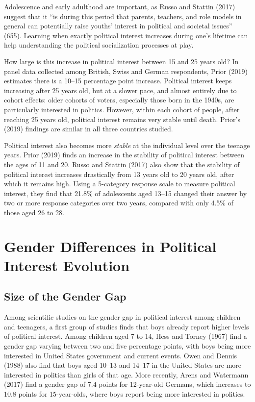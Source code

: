 \documentclass[
  letterpaper,
  DIV=11,
  numbers=noendperiod]{scrreprt}
\begin{document}
Adolescence and early adulthood are important, as Russo and Stattin
(2017) suggest that it ``is during this period that parents, teachers,
and role models in general can potentially raise youths' interest in
political and societal issues'' (655). Learning when exactly political
interest increases during one's lifetime can help understanding the
political socialization processes at play.

How large is this increase in political interest between 15 and 25 years
old? In panel data collected among British, Swiss and German
respondents, Prior (2019) estimates there is a 10--15 percentage point
increase. Political interest keeps increasing after 25 years old, but at
a slower pace, and almost entirely due to cohort effects: older cohorts
of voters, especially those born in the 1940s, are particularly
interested in politics. However, within each cohort of people, after
reaching 25 years old, political interest remains very stable until
death. Prior's (2019) findings are similar in all three countries
studied.

Political interest also becomes more \emph{stable} at the individual
level over the teenage years. Prior (2019) finds an increase in the
stability of political interest between the ages of 11 and 20. Russo and
Stattin (2017) also show that the stability of political interest
increases drastically from 13 years old to 20 years old, after which it
remains high. Using a 5-category response scale to measure political
interest, they find that 21.8\% of adolescents aged 13--15 changed their
answer by two or more response categories over two years, compared with
only 4.5\% of those aged 26 to 28.

\hypertarget{gender-differences-in-political-interest-evolution}{%
\section{Gender Differences in Political Interest
Evolution}\label{gender-differences-in-political-interest-evolution}}

\hypertarget{size-of-the-gender-gap}{%
\subsection{Size of the Gender Gap}\label{size-of-the-gender-gap}}

Among scientific studies on the gender gap in political interest among
children and teenagers, a first group of studies finds that boys already
report higher levels of political interest. Among children aged 7 to 14,
Hess and Torney (1967) find a gender gap varying between two and five
percentage points, with boys being more interested in United States
government and current events. Owen and Dennis (1988) also find that
boys aged 10--13 and 14--17 in the United States are more interested in
politics than girls of that age. More recently, Arens and Watermann
(2017) find a gender gap of 7.4 points for 12-year-old Germans, which
increases to 10.8 points for 15-year-olds, where boys report being more
interested in politics.
\end{document}

